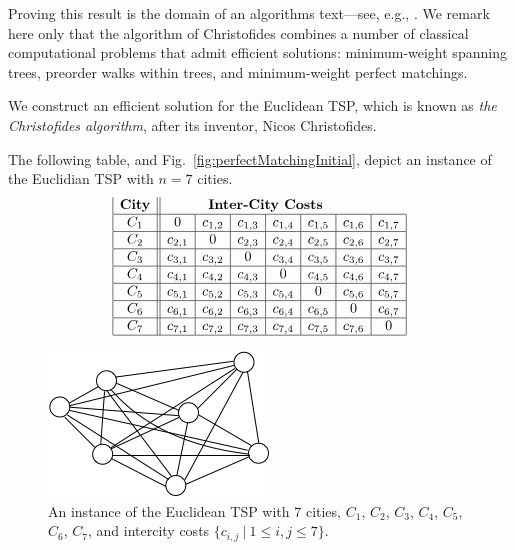 Proving this result is the domain of an algorithms text---see, e.g., \cite{CLRS}.  We remark here only that the algorithm of Christofides combines a number of classical computational problems that admit efficient solutions: minimum-weight spanning trees, preorder walks within trees, and
minimum-weight perfect matchings.

\bigskip

We construct an efficient solution for the Euclidean TSP, which is
known as {\it the Christofides algorithm},  
after its inventor, Nicos Christofides.
\cite{Christofides76}

The following table, and Fig.~\ref{fig:perfectMatchingInitial}, depict
an instance of the Euclidian TSP with $n=7$ cities.
\[
\begin{array}{|c||c|c|c|c|c|c|c|}
\mbox{\bf City} & \multicolumn{6}{c}{\mbox{\bf Inter-City Costs}} \\
\hline
C_1 & 0 & c_{1,2} & c_{1,3} & c_{1,4} & c_{1,5} & c_{1,6} & c_{1,7} \\
\hline
C_2 & c_{2,1} & 0 & c_{2,3} & c_{2,4} & c_{2,5} & c_{2,6} & c_{2,7} \\
\hline
C_3 & c_{3,1} & c_{3,2} & 0 & c_{3,4} & c_{3,5} & c_{3,6} & c_{3,7} \\
\hline
C_4 & c_{4,1} & c_{4,2} & c_{4,3} & 0 & c_{4,5} & c_{4,6} & c_{4,7} \\
\hline
C_5 & c_{5,1} & c_{5,2} & c_{5,3} & c_{5,4} & 0 & c_{5,6} & c_{5,7} \\
\hline
C_6 & c_{6,1} & c_{6,2} & c_{6,3} & c_{6,4} & c_{6,5} & 0 & c_{6,7} \\
\hline
C_7 & c_{7,1} & c_{7,2} & c_{7,3} & c_{7,4} & c_{7,5} & c_{7,6} & 0 \\
\hline
\end{array}
\]


\begin{figure}[hbt]
\begin{center}
       \includegraphics[scale=0.8]{FiguresGraph/christofides1}
\caption{An instance of the Euclidean TSP with $7$ cities, $C_1$,
  $C_2$, $C_3$, $C_4$, $C_5$, $C_6$, $C_7$, and intercity costs
  $\{c_{i,j} \ | \ 1 \leq i,j \leq 7\}$.}
              \label{fig:christofidesInitial}
\end{center}
\end{figure}


